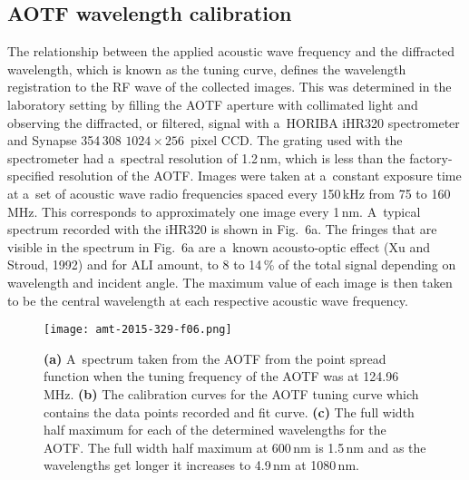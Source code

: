 \documentclass[amt]{copernicus}
\begin{document}
\hack{\newpage}


\subsection{AOTF wavelength calibration}

The relationship between the applied acoustic wave frequency and the
diffracted wavelength, which is known as the tuning curve, defines the
wavelength registration to the RF wave of the collected images. This
was determined in the laboratory setting by filling the AOTF aperture
with collimated light and observing the diffracted, or filtered,
signal with a~HORIBA iHR320 spectrometer and Synapse 354\,308
$1024\times 256$~pixel CCD. The grating used with the spectrometer
had a~spectral resolution of 1.2\,\unit{nm}, which is less than
the factory-specified resolution of the AOTF. Images were taken at
a~constant exposure time at a~set of acoustic wave radio frequencies
spaced every 150\,\unit{kHz} from 75 to 160\,\unit{MHz}. This
corresponds to approximately one image every 1\,\unit{nm}. A~typical
spectrum recorded with the iHR320 is shown in Fig.~6a. The fringes
that are visible in the spectrum in Fig.~6a are a~known acousto-optic
effect (Xu and Stroud, 1992) and for ALI amount, to 8 to 14\,{\%} of
the total signal depending on wavelength and incident angle. The
maximum value of each image is then taken to be the central wavelength
at each respective acoustic wave frequency.

\begin{figure}[t]
\texttt{[image: amt-2015-329-f06.png]}
\caption{\textbf{(a)} A~spectrum taken from the AOTF from the point
  spread function when the tuning frequency of the AOTF was at
  124.96\,\unit{MHz}. \textbf{(b)} The calibration curves for the AOTF
  tuning curve which contains the data points recorded and fit
  curve. \textbf{(c)} The full width half maximum for each of the
  determined wavelengths for the AOTF. The full width half maximum at
  600\,\unit{nm} is 1.5\,\unit{nm} and as the wavelengths get longer
  it increases to 4.9\,\unit{nm} at 1080\,\unit{nm}.}
\end{figure}
\end{document}
